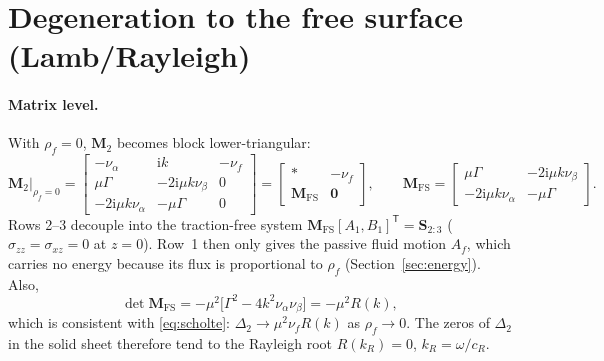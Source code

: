 \documentclass[11pt,a4paper]{article}
\newcommand{\ii}{\mathrm{i}}
\begin{document}
\section{Degeneration to the free surface (Lamb/Rayleigh)}

\paragraph{Matrix level.} With $\rho_f=0$, $\mathbf M_2$ becomes block lower-triangular:
\begin{equation}
\mathbf M_2\big|_{\rho_f=0}=
\begin{bmatrix}
 -\nu_\alpha & \ii k & -\nu_f\\
 \mu\Gamma & -2\ii\mu k\nu_\beta & 0\\
 -2\ii\mu k\nu_\alpha & -\mu\Gamma & 0
\end{bmatrix}
=\begin{bmatrix}
 \ast & -\nu_f\\
 \mathbf M_{\mathrm{FS}} & \mathbf 0
\end{bmatrix},
\qquad
\mathbf M_{\mathrm{FS}}=
\begin{bmatrix}
 \mu\Gamma & -2\ii\mu k\nu_\beta\\
 -2\ii\mu k\nu_\alpha & -\mu\Gamma
\end{bmatrix}.
\end{equation}
Rows 2--3 decouple into the traction-free system
$\mathbf M_{\mathrm{FS}}[A_1,B_1]^{\mathsf T}=\mathbf S_{2:3}$
($\sigma_{zz}=\sigma_{xz}=0$ at $z=0$). Row~1 then only gives the passive fluid motion $A_f$,
which carries no energy because its flux is proportional to $\rho_f$
(Section~\ref{sec:energy}). Also,
\begin{equation}
  \det\mathbf M_{\mathrm{FS}}=-\mu^2\bigl[\Gamma^2-4k^2\nu_\alpha\nu_\beta\bigr]=-\mu^2R(k),
\end{equation}
which is consistent with \eqref{eq:scholte}: $\Delta_2\to\mu^2\nu_fR(k)$ as $\rho_f\to0$. The zeros of
$\Delta_2$ in the solid sheet therefore tend to the Rayleigh root $R(k_R)=0$, $k_R=\omega/c_R$.
\end{document}

